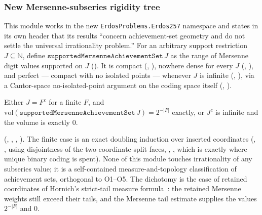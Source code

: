 \subsubsection{New Mersenne-subseries rigidity tree}

This module works in the new \texttt{ErdosProblems.Erdos257} namespace and states in its own header
that its results ``concern achievement-set geometry and do not settle the universal irrationality
problem.'' For an arbitrary support restriction $J\subseteq\mathbb{N}$, define
$\mathtt{supportedMersenneAchievementSet}\,J$ as the range of Mersenne digit values supported on $J$
(). It is compact
(, ),
nowhere dense for every $J$ (,
), and perfect --- compact with no isolated points --- whenever $J$ is infinite
(, ), via a
Cantor-space no-isolated-point argument on the coding space itself
(, ).

\begin{prop}
Either $J=F^c$ for a finite $F$, and $\mathrm{vol}(\mathtt{supportedMersenneAchievementSet}\,J)=2^{-|F|}$
exactly, or $J^c$ is infinite and the volume is exactly $0$.
\end{prop}
(, ,
, ). The finite case is an exact doubling induction over inserted
coordinates (,
, using disjointness of the two coordinate-split faces,
, ,
which is exactly where unique binary coding is spent). None of this module touches irrationality of any
subseries value; it is a self-contained measure-and-topology classification of achievement sets, orthogonal
to O1--O5. The dichotomy is the case of retained coordinates of Hornich's strict-tail measure
formula~\cite[Theorem~4(1), p.~9]{nitecki2013}: the retained Mersenne weights still exceed their
tails, and the Mersenne tail estimate supplies the values $2^{-|F|}$ and $0$.

